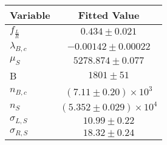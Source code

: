\begin{tabular}[t]{lc}
\hline
Variable &Fitted Value\\
\hline\hline
$f_{\frac{L}{R}}$&$0.434\pm0.021$\\
\hline
$\lambda_{B,c}$&$-0.00142\pm0.00022$\\
\hline
$\mu_S$&$5278.874\pm0.077$\\
\hline
B&$1801\pm51$\\
\hline
$n_{B,c}$&$(7.11\pm0.20)\times 10^3$\\
\hline
$n_S$&$(5.352\pm0.029)\times 10^4$\\
\hline
$\sigma_{L, S}$&$10.99\pm0.22$\\
\hline
$\sigma_{R, S}$&$18.32\pm0.24$\\
\hline
\end{tabular}
